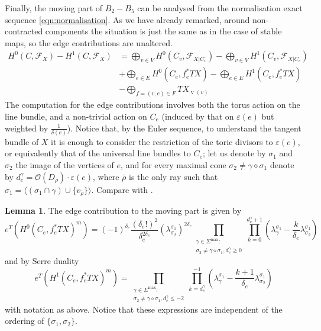 \documentclass[11pt]{amsart}
\newcommand{\OO}{\mathcal{O}}
\newcommand{\F}{\mathcal F}
\newcommand{\vv}{\operatorname{v}}
\theoremstyle{definition}
\newtheorem{lem}[thm]{Lemma}
\theoremstyle{definition}
\begin{document}
Finally, the moving part of $B_2-B_5$ can be analysed from the normalisation exact sequence \eqref{eqn:normalisation}. As we have already remarked, around non-contracted components the situation is just the same as in the case of stable maps, so the edge contributions are unaltered.
\begin{equation}\label{eqn:contrtoF}
\begin{aligned}
 H^0(C,\F_X)-H^1(C,\F_X) &= \bigoplus_{v\in V}H^0(C_v,\F_{X|C_v})-\bigoplus_{v\in V}H^1(C_v,\F_{X|C_v}) \\
 & + \bigoplus_{e\in E}H^0(C_e,f_e^*TX)-\bigoplus_{e\in E}H^1(C_e,f_e^*TX) \\
 & - \bigoplus_{f=(v,e)\in F} TX_{\vv(v)}
\end{aligned} 
\end{equation}
The computation for the edge contributions involves both the torus action on the line bundle, and a non-trivial action on $C_e$ (induced by that on $\varepsilon(e)$ but weighted by $\frac{1}{\delta(e)}$). Notice that, by the Euler sequence, to understand the tangent bundle of $X$ it is enough to consider the restriction of the toric divisors to $\varepsilon(e)$, or equivalently that of the universal line bundles to $C_e$; let us denote by $\sigma_1$ and $\sigma_2$ the image of the vertices of $e$, and for every maximal cone $\sigma_2\neq\gamma\diamond\sigma_1$ denote by $d^\gamma_e=\OO(D_{\bar{\rho}})\cdot \varepsilon(e)$, where $\bar{\rho}$ is the only ray such that $\sigma_1=\langle (\sigma_1\cap\gamma)\cup\{v_{\bar{\rho}}\}\rangle$. Compare with \cite[Lemma 7.4 and Corollary 7.5]{HolgerSpielberg}.
\begin{lem}
The edge contribution to the moving part is given by
\[
 e^T(H^0(C_e,f_e^*TX)^m)=(-1)^{\delta_e}\frac{(\delta_e!)^2}{\delta_e^{2\delta_e}}(\lambda^{\sigma_1}_{\sigma_2})^{2\delta_e}\prod_{\substack{\gamma\in\Sigma^{\text{max}}: \\ \sigma_2\neq\gamma\diamond\sigma_1,d^\gamma_e\geq0}}\prod_{k=0}^{d^\gamma_e+1}(\lambda^{\sigma_1}_{\gamma}-\frac{k}{\delta_e}\lambda^{\sigma_1}_{\sigma_2})
\]
and by Serre duality
\[
 e^T(H^1(C_e,f_e^*TX)^m)=\prod_{\substack{\gamma\in\Sigma^{\text{max}}: \\ \sigma_2\neq\gamma\diamond\sigma_1,d^\gamma_e\leq -2}}\prod_{k=d^\gamma_e}^{-1}(\lambda^{\sigma_1}_{\gamma}-\frac{k+1}{\delta_e}\lambda^{\sigma_1}_{\sigma_2})
\]
with notation as above. Notice that these expressions are independent of the ordering of $\{\sigma_1,\sigma_2\}$.
\end{lem}
\end{document}
